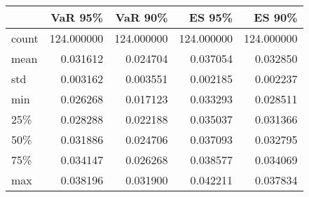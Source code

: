 \begin{tabular}{lrrrr}
\toprule
{} &     VaR 95\% &     VaR 90\% &      ES 95\% &      ES 90\% \\
\midrule
count &  124.000000 &  124.000000 &  124.000000 &  124.000000 \\
mean  &    0.031612 &    0.024704 &    0.037054 &    0.032850 \\
std   &    0.003162 &    0.003551 &    0.002185 &    0.002237 \\
min   &    0.026268 &    0.017123 &    0.033293 &    0.028511 \\
25\%   &    0.028288 &    0.022188 &    0.035037 &    0.031366 \\
50\%   &    0.031886 &    0.024706 &    0.037093 &    0.032795 \\
75\%   &    0.034147 &    0.026268 &    0.038577 &    0.034069 \\
max   &    0.038196 &    0.031900 &    0.042211 &    0.037834 \\
\bottomrule
\end{tabular}
